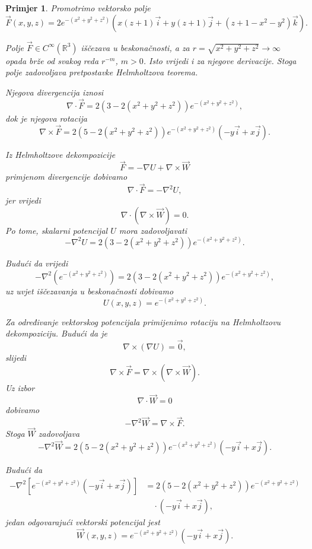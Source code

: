 \documentclass[12pt,a4paper]{article}
\newtheorem{pr}[tm]{Primjer}
\begin{document}
\begin{pr}

Promotrimo vektorsko polje
\[
\overrightarrow{F}(x,y,z)
=
2e^{-(x^2+y^2+z^2)}
\left(
x(z+1)\overrightarrow{i}
+y(z+1)\overrightarrow{j}
+(z+1-x^2-y^2)\overrightarrow{k}
\right).
\]

Polje $\overrightarrow{F}\in C^\infty(\mathbb{R}^3)$ iščezava u
beskonačnosti, a za
$r=\sqrt{x^2+y^2+z^2}\to\infty$ opada brže od svakog reda $r^{-m}$,
$m>0$. Isto vrijedi i za njegove derivacije. Stoga polje zadovoljava
pretpostavke Helmholtzova teorema.

Njegova divergencija iznosi
\[
\nabla\cdot\overrightarrow{F}
=
2\left(3-2(x^2+y^2+z^2)\right)
e^{-(x^2+y^2+z^2)},
\]
dok je njegova rotacija
\[
\nabla\times\overrightarrow{F}
=
2\left(5-2(x^2+y^2+z^2)\right)
e^{-(x^2+y^2+z^2)}
\left(
-y\overrightarrow{i}+x\overrightarrow{j}
\right).
\]

Iz Helmholtzove dekompozicije
\[
\overrightarrow{F}
=
-\nabla U+\nabla\times\overrightarrow{W}
\]
primjenom divergencije dobivamo
\[
\nabla\cdot\overrightarrow{F}
=
-\nabla^2 U,
\]
jer vrijedi
\[
\nabla\cdot
\left(
\nabla\times\overrightarrow{W}
\right)
=0.
\]
Po tome, skalarni potencijal $U$ mora zadovoljavati
\[
-\nabla^2 U
=
2\left(3-2(x^2+y^2+z^2)\right)
e^{-(x^2+y^2+z^2)}.
\]

Budući da vrijedi
\[
-\nabla^2
\left(
e^{-(x^2+y^2+z^2)}
\right)
=
2\left(3-2(x^2+y^2+z^2)\right)
e^{-(x^2+y^2+z^2)},
\]
uz uvjet iščezavanja u beskonačnosti dobivamo
\[
U(x,y,z)
=
e^{-(x^2+y^2+z^2)}.
\]

Za određivanje vektorskog potencijala primijenimo rotaciju na
Helmholtzovu dekompoziciju. Budući da je
\[
\nabla\times(\nabla U)=\overrightarrow{0},
\]
slijedi
\[
\nabla\times\overrightarrow{F}
=
\nabla\times
\left(
\nabla\times\overrightarrow{W}
\right).
\]
Uz izbor
\[
\nabla\cdot\overrightarrow{W}=0
\]
dobivamo
\[
-\nabla^2\overrightarrow{W}
=
\nabla\times\overrightarrow{F}.
\]
Stoga $\overrightarrow{W}$ zadovoljava
\[
-\nabla^2\overrightarrow{W}
=
2\left(5-2(x^2+y^2+z^2)\right)
e^{-(x^2+y^2+z^2)}
\left(
-y\overrightarrow{i}+x\overrightarrow{j}
\right).
\]

Budući da
\[
\begin{aligned}
-\nabla^2
\left[
e^{-(x^2+y^2+z^2)}
\left(
-y\overrightarrow{i}+x\overrightarrow{j}
\right)
\right]
&=
2\left(5-2(x^2+y^2+z^2)\right)e^{-(x^2+y^2+z^2)}\\
&\quad\cdot
\left(
-y\overrightarrow{i}+x\overrightarrow{j}
\right),
\end{aligned}
\]
jedan odgovarajući vektorski potencijal jest
\[
\overrightarrow{W}(x,y,z)
=
e^{-(x^2+y^2+z^2)}
\left(
-y\overrightarrow{i}+x\overrightarrow{j}
\right).
\]


\end{pr}
\end{document}
